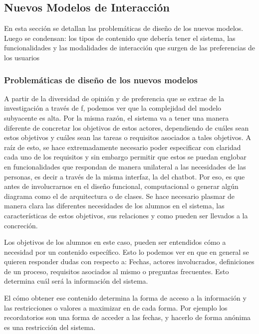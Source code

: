    \subsection{Nuevos Modelos de Interacción}
        \par En esta sección se detallan las problemáticas de diseño de los nuevos modelos. Luego se condensan: los tipos de contenido que debería tener el sistema, las funcionalidades y las modalidades de interacción que surgen de las preferencias de los usuarios

        \subsubsection{Problemáticas de diseño de los nuevos modelos}

        \par A partir de la diversidad de opinión y de preferencia que se extrae de la investigación a través de \acrlong{f}, podemos ver que la complejidad del modelo subyacente es alta. Por la misma razón, el sistema va a tener una manera diferente de concretar los objetivos de estos actores, dependiendo de cuáles sean estos objetivos y cuáles sean las tareas o requisitos asociados a tales objetivos. A raíz de esto, se hace extremadamente necesario poder especificar con claridad cada uno de los requisitos y sin embargo permitir que estos se puedan englobar en funcionalidades que respondan de manera unilateral a las necesidades de las personas, es decir a través de la misma interfaz, la del chatbot. Por eso, es que antes de involucrarnos en el diseño funcional, computacional o generar algún diagrama como el de arquitectura o de clases. Se hace necesario plasmar de manera clara las diferentes necesidades de los alumnos en el sistema, las características de estos objetivos, sus relaciones y como pueden ser llevados a la concreción.
        
        \par Los objetivos de los alumnos en este caso, pueden ser entendidos cómo a necesidad por un contenido específico. Esto lo podemos ver en que en general se quieren responder dudas con respecto a: Fechas, actores involucrados, definiciones de un proceso, requisitos asociados al mismo o preguntas frecuentes. Esto determina cuál será la información del sistema.

        \par El cómo obtener ese contenido determina la forma de acceso a la información y las restricciones o valores a maximizar en de cada forma. Por ejemplo los recordatorios son una forma de acceder a las fechas, y hacerlo de forma anónima es una restricción del sistema.
         
